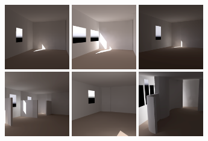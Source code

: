 \begin{figure}[t]

\includegraphics[width=1.11in]{../gi2012_userstudy/images/renderings/renovations/065_camera_chris_march.png} %
\includegraphics[width=1.11in]{../gi2012_userstudy/images/renderings/renovations/065_camera_chris_march_mod.png} %
\hfill
\includegraphics[width=1.11in]{images/renovations/PRE_N6_march_chris.png}
\includegraphics[width=1.11in]{images/renovations/N6_march_chris.png} 
\hfill
\includegraphics[width=1.11in]{../gi2012_userstudy/images/renderings/renovations/042_camera_chris_december}    %
\includegraphics[width=1.11in]{images/renovations/A3_march_chris.png}


\end{figure}

